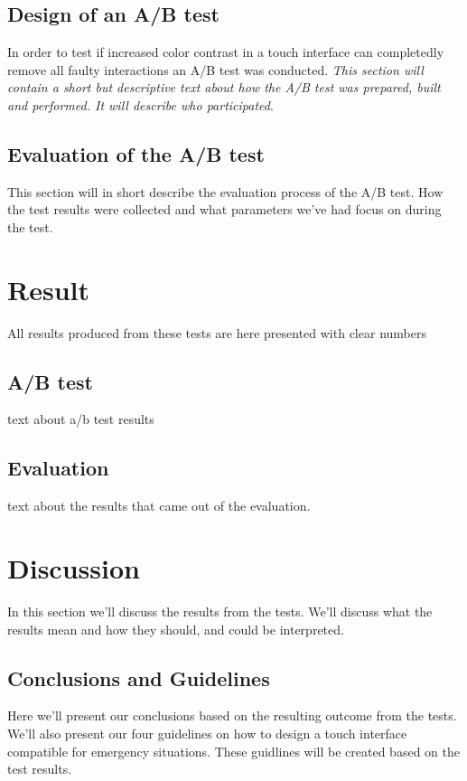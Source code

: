 \documentclass[runningheads,a4paper,oribibl]{llncs}
\begin{document}
\subsection{Design of an A/B test}
In order to test if increased color contrast in a touch interface can completedly remove all faulty interactions an A/B test was conducted.
\emph{This section will contain a short but descriptive text about how the A/B test was prepared, built and performed. It will describe who participated}.

\subsection{Evaluation of the A/B test}
This section will in short describe the evaluation process of the A/B test. How the test results were collected and what parameters we've had focus on during the test.

\section{Result}
All results produced from these tests are here presented with clear numbers

\subsection{A/B test}
text about a/b test results

\subsection{Evaluation}
text about the results that came out of the evaluation.

\section{Discussion}
In this section we'll discuss the results from the tests. We'll discuss what the results mean and how they should, and could be interpreted.

\subsection{Conclusions and Guidelines}
Here we'll present our conclusions based on the resulting outcome from the tests. We'll also present our four guidelines on how to design a touch interface compatible for emergency situations. These guidlines will be created based on the test results.
\end{document}
